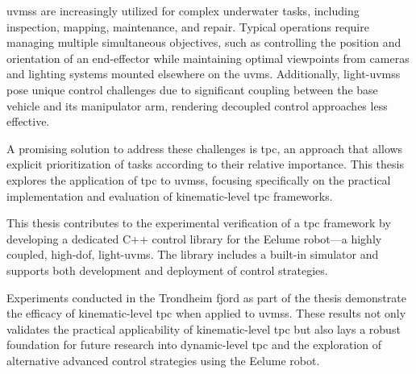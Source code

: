 \Glspl{uvms} are increasingly utilized for complex underwater tasks, including inspection, mapping, maintenance, and repair.
Typical operations require managing multiple simultaneous objectives, such as controlling the position and orientation of an end-effector while maintaining optimal viewpoints from cameras and lighting systems mounted elsewhere on the \gls{uvms}.
Additionally, light-\glspl{uvms} pose unique control challenges due to significant coupling between the base vehicle and its manipulator arm, rendering decoupled control approaches less effective.

A promising solution to address these challenges is \gls{tpc}, an approach that allows explicit prioritization of tasks according to their relative importance. This thesis explores the application of \gls{tpc} to \glspl{uvms}, focusing specifically on the practical implementation and evaluation of kinematic-level \gls{tpc} frameworks.

This thesis contributes to the experimental verification of a \gls{tpc} framework by developing a dedicated C++ control library for the Eelume robot—a highly coupled, high-\gls{dof}, light-\gls{uvms}. The library includes a built-in simulator and supports both development and deployment of control strategies.

Experiments conducted in the Trondheim fjord as part of the thesis demonstrate the efficacy of kinematic-level \gls{tpc} when applied to \glspl{uvms}.
These results not only validates the practical applicability of kinematic-level \gls{tpc} but also lays a robust foundation for future research into dynamic-level \gls{tpc} and the exploration of alternative advanced control strategies using the Eelume robot.

